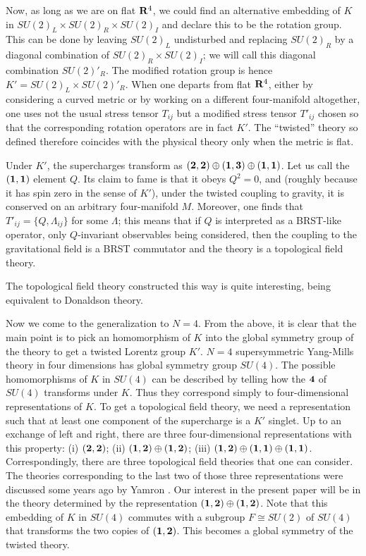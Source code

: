 \documentclass[12pt]{article}
\numberwithin{equation}{section}
\begin{document}
Now, as long as we are on flat ${\bf R}^4$, we could find an alternative
embedding of $K$ in $SU(2)_L\times SU(2)_R\times SU(2)_I$ and declare
this to be the rotation group.  This can be done by leaving $SU(2)_L$
undisturbed and replacing $SU(2)_R$ by a diagonal combination of $SU(2)_R
\times SU(2)_I$; we will call this diagonal combination $SU(2)'{}_R$.
The modified rotation group is hence $K'=SU(2)_L\times SU(2)'{}_R$.
When one departs from flat ${\bf R}^4$, either by considering a curved
metric or by working on a different four-manifold altogether,
one uses not the usual stress tensor $T_{ij}$ but a modified
stress tensor $T'_{ij}$ chosen so that the corresponding rotation
operators are in fact $K'$.  The ``twisted'' theory so defined
therefore coincides with the physical theory only when the metric is flat.

Under $K'$, the supercharges transform as $({\bf 2},{\bf 2})
\oplus ({\bf 1},{\bf 3})\oplus ({\bf 1},{\bf 1})$.  Let us call
the $({\bf 1},{\bf 1})$ element $Q$.  Its claim to fame is that
it obeys $Q^2=0$, and (roughly because it has spin zero in the sense of
$K'$), under the twisted coupling to gravity, it is
conserved on an arbitrary four-manifold $M$.
Moreover, one finds that
$T'{}_{ij}=\{Q,\Lambda_{ij}\}$ for some $\Lambda$; this means that if
$Q$ is interpreted as a BRST-like operator, only $Q$-invariant
observables being considered, then the coupling to the gravitational
field is a BRST commutator and the theory is a topological field theory.

The topological field theory constructed this way is quite interesting,
being equivalent to Donaldson theory.

\bigskip
{}

Now we come to the generalization to $N=4$.  From the above,
it is clear that the main point is to pick an homomorphism of $K$
into the global symmetry group of the theory to get a twisted Lorentz
group $K'$.
$N=4$ supersymmetric Yang-Mills theory in four dimensions has
global symmetry group $SU(4)$.
The possible homomorphisms of $K$ in $SU(4)$ can be described
by telling how the ${\bf 4}$ of $SU(4)$ transforms under $K$.
Thus they correspond simply to four-dimensional representations
of $K$.  To get a topological field theory, we need a representation
such that at least one component of the supercharge is a $K'$ singlet.
Up to an exchange of left and right, there are three four-dimensional
representations with this property:
(i) $({\bf 2},{\bf 2})$; (ii)
$({\bf 1},{\bf 2})\oplus ({\bf 1},{\bf 2})$; (iii)  $({\bf 1},{\bf 2})
\oplus ({\bf 1},{\bf 1})\oplus ({\bf 1},{\bf 1})$.  Correspondingly,
there are three topological field theories that one can consider.  The
theories corresponding to the last two of those three representations
were discussed some years ago by Yamron \cite{yam}.  Our interest in the
present paper will be in the theory determined by the representation
$({\bf 1},{\bf 2})\oplus ({\bf 1},{\bf 2})$.  Note that this embedding
of $K$ in $SU(4)$ commutes with a subgroup $F\cong SU(2)$ of $SU(4)$
that transforms the two copies of $({\bf 1},{\bf 2})$.  This becomes
a global  symmetry of the twisted theory.
\end{document}
